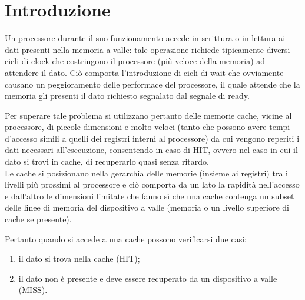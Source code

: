 \clearpage{\pagestyle{empty}\cleardoublepage}
\chapter*{Introduzione} 


Un processore durante il suo funzionamento accede in scrittura o in lettura ai dati presenti nella memoria a valle: tale operazione richiede tipicamente diversi cicli di clock che costringono il processore (pi\`u veloce della memoria) ad attendere il dato.
Ci\`o comporta l'introduzione di cicli di wait che ovviamente causano un peggioramento delle performace del processore, il quale attende che la memoria gli presenti il dato richiesto segnalato dal segnale di ready.

Per superare tale problema si utilizzano pertanto delle memorie cache, vicine al processore, di piccole dimensioni e molto veloci (tanto che possono avere tempi d'accesso simili a quelli dei registri interni al processore) da cui vengono reperiti i dati necessari all'esecuzione, consentendo in caso di HIT, ovvero nel caso in cui il dato si trovi in cache, di recuperarlo quasi senza ritardo.\\

Le cache si posizionano nella gerarchia delle memorie (insieme ai registri) tra i livelli pi\`u prossimi al processore e ci\`o comporta da un lato la rapidit\`a nell'accesso e dall'altro le dimensioni limitate che fanno s\`i che una cache contenga un subset delle linee di memoria del dispositivo a valle (memoria o un livello superiore di cache se presente).

Pertanto quando si accede a una cache possono verificarsi due casi:
\begin{enumerate}
\item il dato si trova nella cache (HIT);
\item il dato non \`e presente e deve essere recuperato da un dispositivo a valle (MISS). 
\end{enumerate}

